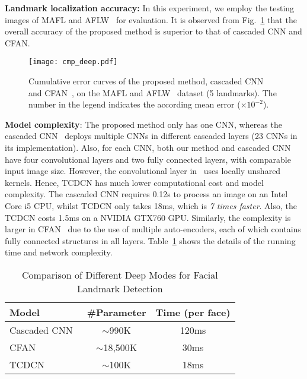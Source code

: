 \documentclass[10pt,journal,compsoc]{IEEEtran}
\begin{document}
\noindent\textbf{Landmark localization accuracy:}
In this experiment, we employ the testing images of MAFL and AFLW~\cite{Kostinger2011} for evaluation. It is observed from Fig.~\ref{fig:cmp_deep} that the overall accuracy of the proposed method is superior to that of cascaded CNN and CFAN.
\begin{figure}[t]
  \centering
  \texttt{[image: cmp\_deep.pdf]}
  \vskip -0.3cm
  \caption{Cumulative error curves of the proposed method, cascaded CNN~\cite{Sun2013} and CFAN~\cite{zhang2014coarse}, on the MAFL and AFLW~\cite{Kostinger2011} dataset (5 landmarks). The number in the legend indicates the according mean error ($\times 10^{-2}$).}
  \label{fig:cmp_deep}
\end{figure}

\vspace{0.1cm}
\noindent\textbf{Model complexity}:
The proposed method only has one CNN, whereas the cascaded CNN~\cite{Sun2013} deploys multiple CNNs in different cascaded layers (23 CNNs in its implementation). Also, for each CNN, both our method and cascaded CNN~\cite{Sun2013} have four convolutional layers and two fully connected layers, with comparable input image size. However, the convolutional layer in~\cite{Sun2013} uses locally unshared kernels. Hence, TCDCN has much lower computational cost and model complexity. The cascaded CNN requires 0.12s to process an image on an Intel Core i5 CPU, whilst TCDCN only takes 18ms, which is \textit{7 times faster}. Also, the TCDCN costs 1.5ms on a NVIDIA GTX760 GPU. Similarly, the complexity is larger in CFAN~\cite{zhang2014coarse} due to the use of multiple auto-encoders, each of which contains fully connected structures in all layers. Table~\ref{tab:complexity} shows the details of the running time and network complexity.

\begin{table}[t]
\caption{Comparison of Different Deep Modes for Facial Landmark Detection}
\label{tab:complexity}
\vskip -0.75cm
\begin{center}
\begin{tabular}{l|c|c}
\hline
Model&\#Parameter&Time (per face)\\
\hline\hline
Cascaded CNN~\cite{Sun2013}&$\sim$990K&120ms\\
CFAN~\cite{zhang2014coarse}&$\sim$18,500K&30ms\\
TCDCN&$\sim$100K&18ms\\

\hline
\end{tabular}
\end{center}
\vskip -0.4cm
\end{table}
\end{document}
